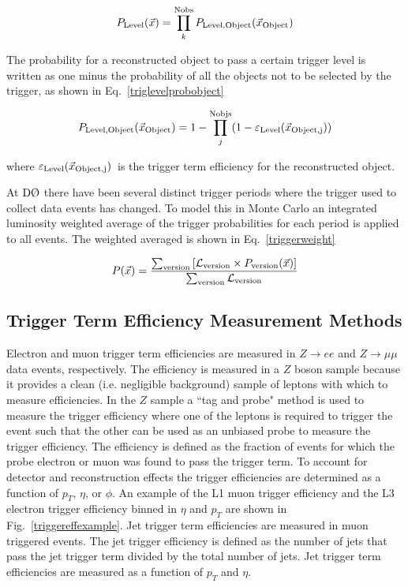 \begin{equation}
\label{triglevelprob}
P_{\rm{Level}}(\vec{x}) = \prod_{k}^{\rm{Nobs}} P_{\rm{Level,Object}}(\vec{x}_{\rm{Object}})
\end{equation}

The probability for a reconstructed object to pass a certain trigger level is written as one minus the probability of all the objects not to be selected by the trigger, as shown in Eq.~\ref{triglevelprobobject}

\begin{equation}
\label{triglevelprobobject}
P_{\rm{Level,Object}}(\vec{x}_{\rm{Object}}) = 1 - \prod_{j}^{\rm{Nobjs}}( 1 - \varepsilon_{\rm{Level}}(\vec{x}_{\rm{Object},j}) )
\end{equation}

\noindent where $\varepsilon_{\rm{Level}}(\vec{x}_{\rm{Object},j})$~is the trigger term efficiency for the reconstructed object.

At $\dzero$ there have been several distinct trigger periods where the trigger used to collect data events has changed. To model this in Monte Carlo an integrated luminosity weighted average of the trigger probabilities for each period is applied to all events. The weighted averaged is shown in Eq.~\ref{triggerweight}

\begin{equation}
\label{triggerweight}
P(\vec{x}) = \frac{\sum_{\rm{version}} \left[ \mathcal{L}_{\rm{version}} \times P_{\rm{version}}(\vec{x}) \right]}{\sum_{\rm{version}} \mathcal{L}_{\rm{version}}}
\end{equation}

\subsection{Trigger Term Efficiency Measurement Methods}
\label{triggereffmethod}

Electron and muon trigger term efficiencies are measured in $Z\rightarrow ee$ and $Z\rightarrow \mu\mu$ data events, respectively. The efficiency is measured in a $Z$ boson sample because it provides a clean (i.e. negligible background) sample of leptons with which to measure efficiencies. In the $Z$ sample a ``tag and probe" method is used to measure the trigger efficiency where one of the leptons is required to trigger the event such that the other can be used as an unbiased probe to measure the trigger efficiency. The efficiency is defined as the fraction of events for which the probe electron or muon was found to pass the trigger term. To account for detector and reconstruction effects the trigger efficiencies are determined as a function of $p_{T}$, $\eta$, or $\phi$. An example of the L1 muon trigger efficiency and the L3 electron trigger efficiency binned in $\eta$ and $p_{T}$ are shown in Fig.~\ref{triggereffexample}. Jet trigger term efficiencies are measured in muon triggered events. The jet trigger efficiency is defined as the number of jets that pass the jet trigger term divided by the total number of jets. Jet trigger term efficiencies are measured as a function of $p_{T}$ and $\eta$.


